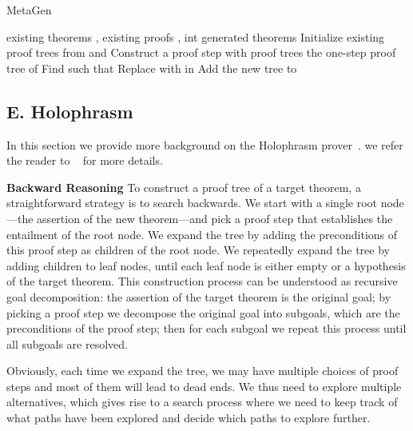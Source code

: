 \documentclass{article}
\begin{document}
\begin{algorithm}[!ht]
   \caption{MetaGen}
   \label{algo:metagen}
\begin{algorithmic}
 existing theorems , existing proofs , int 
 generated theorems
\STATE Initialize existing proof trees  from  and 
\REPEAT
    \STATE Construct a proof step  with proof trees 
    \STATE  the one-step proof tree of 
        \STATE{}
        \STATE Find  such that 
        \STATE Replace  with  in  
    \ENDFOR
    \STATE Add the new tree  to 
\end{algorithmic}
\end{algorithm} 

\subsection*{E. Holophrasm}
\label{app:holophrasm}

In this section we provide more background on the Holophrasm prover~\cite{whalen2016holophrasm}. we refer the reader to ~\citet{whalen2016holophrasm} for more details. 

\noindent\textbf{Backward Reasoning}
To construct a proof tree of a target theorem, a straightforward strategy is to search backwards. We start with a single root node---the assertion of the new theorem---and pick a proof step that  establishes the entailment of the root node. We expand the tree by adding the preconditions of this proof step as children of the root node. 
We repeatedly expand the tree by adding children to leaf nodes, until each leaf node is either empty or a hypothesis of the target theorem. This construction process can be understood as recursive goal decomposition: the assertion of the target theorem is the original goal; by picking a proof step we decompose the original goal into subgoals, which are the preconditions of the proof step; then for each subgoal we repeat this process until all subgoals are resolved. 

Obviously, each time we expand the tree, we may have multiple choices of proof steps and most of them will lead to dead ends. We thus need to explore multiple alternatives, which gives rise to a search process where we need to keep track of what paths  have been explored and decide which paths to explore further.
\end{document}
